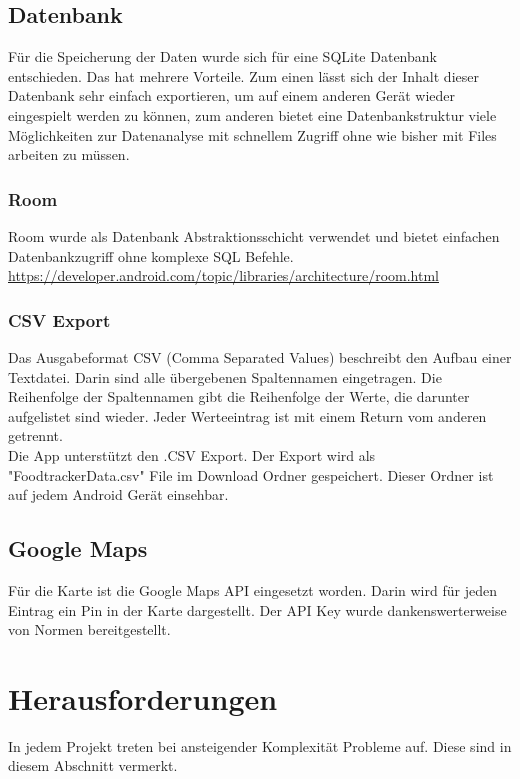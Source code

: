 \documentclass[
    DIV12,
    cleardouble=plain,
    headings=normal,
    pdftex,
    headexclude,footexclude,
    final
]{scrreprt}
\begin{document}
\section{Datenbank}
Für die Speicherung der Daten wurde sich für eine SQLite Datenbank entschieden. Das hat mehrere Vorteile. Zum einen lässt sich der Inhalt dieser Datenbank sehr einfach exportieren, um auf einem anderen Gerät wieder eingespielt werden zu können, zum anderen bietet eine Datenbankstruktur viele Möglichkeiten zur Datenanalyse mit schnellem Zugriff ohne wie bisher mit Files arbeiten zu müssen.

\subsection{Room}
Room wurde als Datenbank Abstraktionsschicht verwendet und bietet einfachen Datenbankzugriff ohne komplexe SQL Befehle.
\url{https://developer.android.com/topic/libraries/architecture/room.html}


\subsection{CSV Export}
Das Ausgabeformat CSV (Comma Separated Values) beschreibt den Aufbau einer Textdatei. Darin sind alle übergebenen Spaltennamen eingetragen. Die Reihenfolge der Spaltennamen gibt die Reihenfolge der Werte, die darunter aufgelistet sind wieder. Jeder Werteeintrag ist mit einem Return vom anderen getrennt.\\
Die App unterstützt den .CSV Export. Der Export wird als "FoodtrackerData.csv" File im Download Ordner gespeichert.
Dieser Ordner ist auf jedem Android Gerät einsehbar.



\section{Google Maps}
Für die Karte ist die Google Maps API eingesetzt worden. Darin wird für jeden Eintrag ein Pin in der Karte dargestellt.
Der API Key wurde dankenswerterweise von Normen bereitgestellt.





\newpage

\chapter{Herausforderungen}
In jedem Projekt treten bei ansteigender Komplexität Probleme auf. Diese sind in diesem Abschnitt vermerkt.
\end{document}
